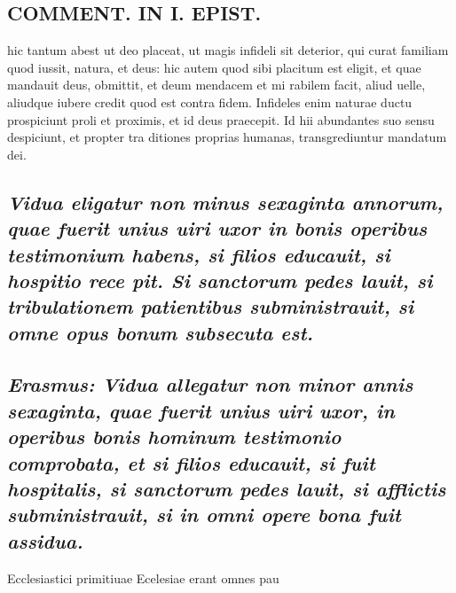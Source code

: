 \documentclass{article}
\begin{document}
\begin{pages}
\section*{COMMENT. IN I. EPIST. }
\marginpar{[ p.122 ]}\pstart hic tantum abest ut deo placeat, ut magis infideli sit deterior, qui curat familiam quod iussit, natura, et deus: hic autem quod sibi placitum est eligit, et quae mandauit deus, obmittit, et deum mendacem et mi rabilem facit, aliud uelle, aliudque iubere credit quod est contra fidem. Infideles enim naturae ductu prospiciunt proli et proximis, et id deus praecepit. Id hii abundantes suo sensu despiciunt, et propter tra ditiones proprias humanas, transgrediuntur mandatum dei.  \pend
{}
{}
\subsection*{\textit{Vidua eligatur non minus sexaginta annorum, quae fuerit unius uiri uxor in bonis operibus testimonium habens, si filios educauit, si hospitio rece pit. Si sanctorum pedes lauit, si tribulationem patientibus subministrauit, si omne opus bonum subsecuta est. }}
{}
\subsection*{\textit{Erasmus: Vidua allegatur non minor annis sexaginta, quae fuerit unius uiri uxor, in operibus bonis hominum testimonio comprobata, et si filios educauit, si fuit hospitalis, si sanctorum pedes lauit, si afflictis subministrauit, si in omni opere bona fuit assidua. }}\pstart Ecclesiastici primitiuae Ecelesiae erant omnes pau\pend

\end{pages}
\end{document}
